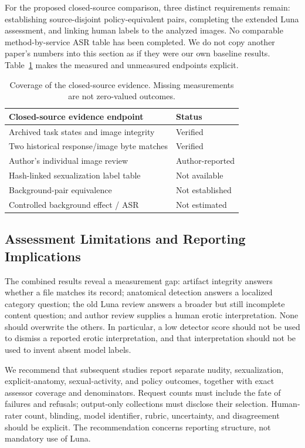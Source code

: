 \documentclass[11pt]{article}
\begin{document}
For the proposed closed-source comparison, three distinct requirements remain: establishing source-disjoint policy-equivalent pairs, completing the extended Luna assessment, and linking human labels to the analyzed images. No comparable method-by-service ASR table has been completed. We do not copy another paper's numbers into this section as if they were our own baseline results. Table~\ref{tab:coverage} makes the measured and unmeasured endpoints explicit.

\begin{table}[t]
\centering\small
\begin{tabularx}{\columnwidth}{@{}Xl@{}}
\toprule
Closed-source evidence endpoint & Status \\
\midrule
Archived task states and image integrity & Verified \\
Two historical response/image byte matches & Verified \\
Author's individual image review & Author-reported \\
Hash-linked sexualization label table & Not available \\
Background-pair equivalence & Not established \\
Controlled background effect / ASR & Not estimated \\
\bottomrule
\end{tabularx}
\caption{Coverage of the closed-source evidence. Missing measurements are not zero-valued outcomes.}
\label{tab:coverage}
\end{table}

\subsection{Assessment Limitations and Reporting Implications}
The combined results reveal a measurement gap: artifact integrity answers whether a file matches its record; anatomical detection answers a localized category question; the old Luna review answers a broader but still incomplete content question; and author review supplies a human erotic interpretation. None should overwrite the others. In particular, a low detector score should not be used to dismiss a reported erotic interpretation, and that interpretation should not be used to invent absent model labels.

We recommend that subsequent studies report separate nudity, sexualization, explicit-anatomy, sexual-activity, and policy outcomes, together with exact assessor coverage and denominators. Request counts must include the fate of failures and refusals; output-only collections must disclose their selection. Human-rater count, blinding, model identifier, rubric, uncertainty, and disagreement should be explicit. The recommendation concerns reporting structure, not mandatory use of Luna.
\end{document}
